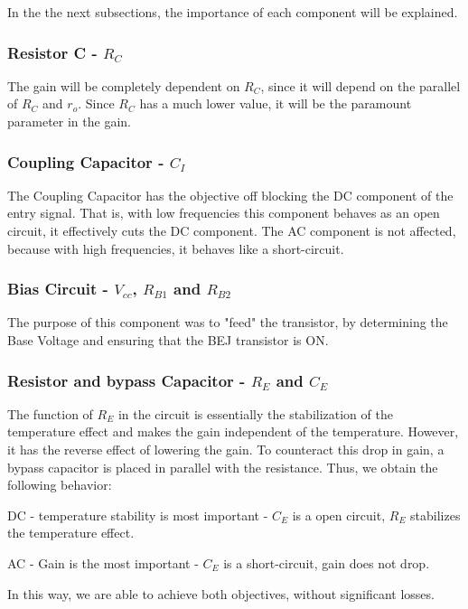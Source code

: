 In the the next subsections, the importance of each component will be explained.

\subsubsection{Resistor C - $R_C$}

The gain will be completely dependent on $R_C$, since it will depend on the parallel of $R_C$ and $r_o$. Since $R_C$ has a much lower value, it will be the paramount parameter in the gain.


\subsubsection{Coupling Capacitor - $C_I$}

The Coupling Capacitor has the objective off blocking the DC component of the entry signal. That is, with low frequencies this component behaves as an open circuit, it effectively cuts the DC component. The AC component is not affected, because with high frequencies, it behaves like a short-circuit.

\subsubsection{Bias Circuit - $V_{cc}$, $R_{B1}$ and $R_{B2}$}

The purpose of this component was to "feed" the transistor, by determining the Base Voltage and ensuring that the BEJ transistor is ON.


\subsubsection{Resistor and bypass Capacitor - $R_E$ and $C_E$}

The function of $ R_E $ in the circuit is essentially the stabilization of the temperature effect and makes the gain independent of the temperature. However, it has the reverse effect of lowering the gain. To counteract this drop in gain, a bypass capacitor is placed in parallel with the resistance. Thus, we obtain the following behavior:


DC - temperature stability is most important - $C_E$ is a open circuit, $R_E$ stabilizes the temperature effect.

AC - Gain is the most important - $C_E$ is a short-circuit, gain does not drop.

In this way, we are able to achieve both objectives, without significant losses.


